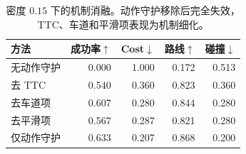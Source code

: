 \begin{table}[t]
\centering
\caption{密度 $0.15$ 下的机制消融。动作守护移除后完全失效，TTC、车道和平滑项表现为机制细化。}
\label{tab:ablation-d015}
\small
\begin{tabular}{lrrrr}
\toprule
方法 & 成功率$\uparrow$ & Cost$\downarrow$ & 路线$\uparrow$ & 碰撞$\downarrow$ \\
\midrule
无动作守护 & 0.000 & 1.000 & 0.172 & 0.513 \\
去 TTC & 0.540 & 0.360 & 0.823 & 0.360 \\
去车道项 & 0.607 & 0.280 & 0.844 & 0.280 \\
去平滑项 & 0.567 & 0.287 & 0.821 & 0.280 \\
仅动作守护 & 0.633 & 0.207 & 0.868 & 0.200 \\
\bottomrule
\end{tabular}
\end{table}
